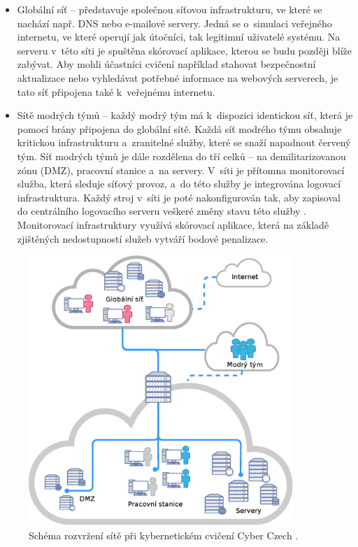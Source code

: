 \documentclass[
  digital,
  twoside,
  table, 
  nolof, 
  nolot
]{fithesis3}
\begin{document}
\begin{itemize}
    \item Globální síť -- představuje společnou síťovou infrastrukturu, ve které se nachází např. DNS nebo e-mailové servery. Jedná se o~simulaci veřejného internetu, ve které operují jak útočníci, tak legitimní uživatelé systému. Na serveru v~této síti je spuštěna skórovací aplikace, kterou se budu později blíže zabývat. Aby mohli účastníci cvičení například stahovat bezpečnostní aktualizace nebo vyhledávat potřebné informace na webových serverech, je tato síť připojena také k~veřejnému internetu.
    \item Sítě modrých týmů -- každý modrý tým má k~dispozici identickou síť, která je pomocí brány připojena do globální sítě. Každá síť modrého týmu obsahuje kritickou infrastrukturu a~zranitelné služby, které se snaží napadnout červený tým. Síť modrých týmů je dále rozdělena do tří celků -- na demilitarizovanou zónu (DMZ), pracovní stanice a~na servery. V~síti je přítomna monitorovací služba, která sleduje síťový provoz, a~do této služby je integrována logovací infrastruktura. Každý stroj v~síti je poté nakonfigurován tak, aby zapisoval do centrálního logovacího serveru veškeré změny stavu této služby \cite{CeledaKYPO-AExercises}. Monitorovací infrastruktury využívá skórovací aplikace, která na základě zjištěných nedostupností služeb vytváří bodové penalizace.
\end{itemize}

\begin{figure}[h]
    \centering
    \includegraphics[width=10cm]{images/kypo-network.eps}
    \caption{Schéma rozvržení sítě při kybernetickém cvičení Cyber Czech \cite{Vykopal2017LessonsRange}.}
    \label{fig:kypoNetwork}
\end{figure}
\end{document}
